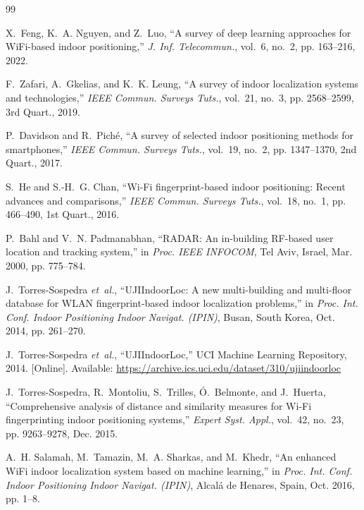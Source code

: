 \documentclass[conference]{IEEEtran}
\begin{document}
\balance
\begin{thebibliography}{99}

X.~Feng, K.~A. Nguyen, and Z.~Luo, ``A survey of deep learning approaches for WiFi-based indoor positioning,'' \emph{J. Inf. Telecommun.}, vol.~6, no.~2, pp. 163--216, 2022.

F.~Zafari, A.~Gkelias, and K.~K. Leung, ``A survey of indoor localization systems and technologies,'' \emph{IEEE Commun. Surveys Tuts.}, vol.~21, no.~3, pp. 2568--2599, 3rd Quart., 2019.

P.~Davidson and R.~Pich\'e, ``A survey of selected indoor positioning methods for smartphones,'' \emph{IEEE Commun. Surveys Tuts.}, vol.~19, no.~2, pp. 1347--1370, 2nd Quart., 2017.

S.~He and S.-H.~G. Chan, ``Wi-Fi fingerprint-based indoor positioning: Recent advances and comparisons,'' \emph{IEEE Commun. Surveys Tuts.}, vol.~18, no.~1, pp. 466--490, 1st Quart., 2016.

P.~Bahl and V.~N. Padmanabhan, ``RADAR: An in-building RF-based user location and tracking system,'' in \emph{Proc. IEEE INFOCOM}, Tel Aviv, Israel, Mar. 2000, pp. 775--784.

J.~Torres-Sospedra \emph{et~al.}, ``UJIIndoorLoc: A new multi-building and multi-floor database for WLAN fingerprint-based indoor localization problems,'' in \emph{Proc. Int. Conf. Indoor Positioning Indoor Navigat. (IPIN)}, Busan, South Korea, Oct. 2014, pp. 261--270.

J.~Torres-Sospedra \emph{et~al.}, ``UJIIndoorLoc,'' UCI Machine Learning Repository, 2014. [Online]. Available: \url{https://archive.ics.uci.edu/dataset/310/ujiindoorloc}

J.~Torres-Sospedra, R.~Montoliu, S.~Trilles, \'O.~Belmonte, and J.~Huerta, ``Comprehensive analysis of distance and similarity measures for Wi-Fi fingerprinting indoor positioning systems,'' \emph{Expert Syst. Appl.}, vol.~42, no.~23, pp. 9263--9278, Dec. 2015.

A.~H. Salamah, M.~Tamazin, M.~A. Sharkas, and M.~Khedr, ``An enhanced WiFi indoor localization system based on machine learning,'' in \emph{Proc. Int. Conf. Indoor Positioning Indoor Navigat. (IPIN)}, Alcal\'a de Henares, Spain, Oct. 2016, pp. 1--8.


\end{thebibliography}
\end{document}
